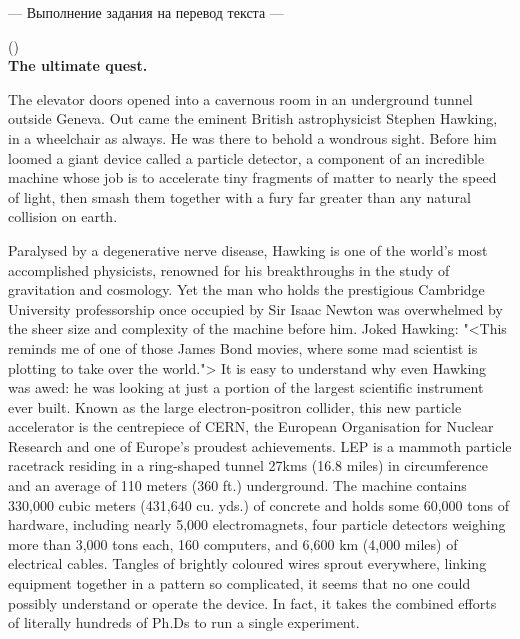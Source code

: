 \documentclass[main.tex]{subfiles}
\begin{document}


\hypertarget{ltask:2024-01-31-4}{--- Выполнение задания на перевод текста ---} (\hyperref[task:2024-01-31-4]{\color{blue}{перейти к тексту задания}})
\\

\textbf{The ultimate quest.}

The elevator doors opened into a cavernous room in an underground tunnel outside Geneva.
Out came the eminent British astrophysicist Stephen Hawking, in a wheelchair as always.
He was there to behold a wondrous sight.
Before him loomed a giant device called a particle detector, a component of an incredible machine whose job is to accelerate tiny fragments of matter to nearly the speed of light, then smash them together with a fury far greater than any natural collision on earth.

Paralysed by a degenerative nerve disease, Hawking is one of the world's most accomplished physicists, renowned for his breakthroughs in the study of gravitation and cosmology.
Yet the man who holds the prestigious Cambridge University professorship once occupied by Sir Isaac Newton was overwhelmed by the sheer size and complexity of the machine before him.
Joked Hawking: "<This reminds me of one of those James Bond movies, where some mad scientist is plotting to take over the world.">
It is easy to understand why even Hawking was awed: he was looking at just a portion of the largest scientific instrument ever built.
Known as the large electron-positron collider, this new particle accelerator is the centrepiece of CERN, the European Organisation for Nuclear Research and one of Europe's proudest achievements.
LEP is a mammoth particle racetrack residing in a ring-shaped tunnel 27kms (16.8 miles) in circumference and an average of 110 meters (360 ft.) underground.
The machine contains 330,000 cubic meters (431,640 cu. yds.) of concrete and holds some 60,000 tons of hardware, including nearly 5,000 electromagnets, four particle detectors weighing more than 3,000 tons each, 160 computers, and 6,600 km (4,000 miles) of electrical cables.
Tangles of brightly coloured wires sprout everywhere, linking equipment together in a pattern so complicated, it seems that no one could possibly understand or operate the device.
In fact, it takes the combined efforts of literally hundreds of Ph.Ds to run a single experiment.
\\

\end{document}
